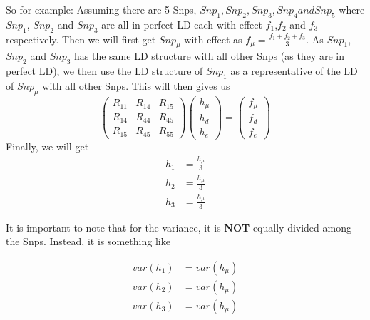 \documentclass[12pt,a4paper,twoside]{report}
\begin{document}
So for example:
Assuming there are 5 Snps, $Snp_1, Snp_2, Snp_3, Snp_4 and Snp_5$ where $Snp_1$, $Snp_2$ and $Snp_3$ are all in perfect LD each with effect $f_1$,$f_2$ and $f_3$ respectively.
Then we will first get $Snp_\mu$ with effect as $f_\mu = \frac{f_1+f_2+f_3}{3}$. 
As $Snp_1$, $Snp_2$ and $Snp_3$ has the same LD structure with all other Snps (as they are in perfect LD), we then use the LD structure of $Snp_1$ as a representative of the LD of $Snp_\mu$ with all other Snps. 
This will then gives us
\[ \left( \begin{array}{ccc}
R_{11} & R_{14} & R_{15}\\
R_{14} & R_{44} & R_{45}\\
R_{15} & R_{45} & R_{55}
\end{array} \right)
%
\left( \begin{array}{c}
h_\mu \\
h_d \\
h_e
\end{array} \right)
=
\left( \begin{array}{c}
f_\mu \\
f_d \\
f_e
\end{array} \right)
\]
Finally, we will get
\begin{align*}
h_1 &= \frac{h_\mu}{3} \\
h_2 &= \frac{h_\mu}{3} \\
h_3 &= \frac{h_\mu}{3}
\end{align*}

It is important to note that for the variance, it is \textbf{NOT} equally divided among the Snps. 
Instead, it is something like

\begin{align*}
var(h_1) &= var(h_\mu) \\
var(h_2) &= var(h_\mu) \\
var(h_3) &= var(h_\mu)
\end{align*}
\end{document}
